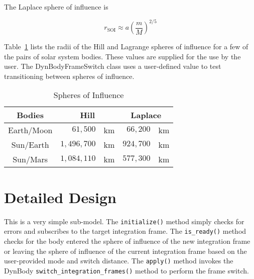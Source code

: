 The Laplace sphere of influence is

\begin{equation}
r_{\text{SOI}} \approx a  \left(\frac{m}{M}\right)^{2/5}
\end{equation}

Table~\ref{tab:DynBodyFrameSwitch:SOI} lists the radii of the
Hill and Lagrange spheres of influence for a few of the pairs of
solar system bodies. These values are supplied for the use by the user.
The DynBodyFrameSwitch class uses a user-defined value to test transitioning
between spheres of influence.

\begin{table}[htp]
\centering
\caption{Spheres of Influence}
\label{tab:DynBodyFrameSwitch:SOI}
\vspace{1ex}
\begin{tabular}{||c||rl|rl|} \hline
{\bf Bodies} &
\multicolumn{2}{|c|}{\bf Hill} &
\multicolumn{2}{|c|}{\bf Laplace} \\ \hline \hline
Earth/Moon   &    $61,500$ & km &  $66,200$ & km  \\
Sun/Earth    & $1,496,700$ & km & $924,700$ & km  \\
Sun/Mars     & $1,084,110$ & km & $577,300$ & km  \\ \hline
\end{tabular}
\end{table}

\section{Detailed Design}
This is a very simple sub-model.
The {\tt initialize()} method simply checks for errors and subscribes to the
target integration frame. The {\tt is\_ready()} method checks for the
body entered the sphere of influence of the new integration frame or leaving
the sphere of influence of the current integration frame based on the
user-provided mode and switch distance. The {\tt apply()} method invokes
the DynBody {\tt switch\_integration\_frames()} method to perform
the frame switch.
